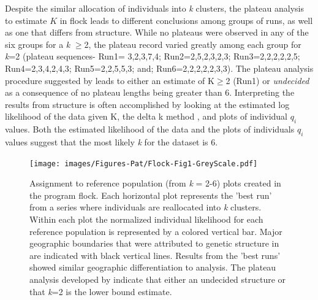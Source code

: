 Despite the similar allocation of individuals into \textit{k} clusters, the 
plateau analysis to estimate $K$ in {\sc flock} leads to different conclusions among groups of runs, as well as 
one that differs from {\sc structure}. While no plateaus were observed in any of the six groups 
for a \textit{k} $\geq$2, the plateau record varied greatly among each
group for \textit{k}=2 (plateau  sequences- Run1= 3,2,3,7,4; Run2=2,5,2,3,2,3; Run3=2,2,2,2,2,5; 
Run4=2,3,4,2,4,3; Run5=2,2,5,5,3; and; Run6=2,2,2,2,2,3,3). The plateau analysis 
procedure suggested by \citet{Duc&Tur2012} leads to 
either an estimate of K$\geq$2 (Run1) or \textit{undecided} as a consequence of no plateau 
lengths being greater than 6. Interpreting the results from {\sc structure} is often accomplished by 
looking at the estimated log likelihood of the data given K, the delta k method \citep{Evannoetal2005}, and plots of 
individual \textit{$q_i$} values. Both the estimated likelihood of the data
and the plots of individuals \textit{$q_i$} values suggest that 
the most likely \textit{k} for the dataset is 6. 

\begin{figure}
\begin{center}
    \texttt{[image: images/Figures-Pat/Flock-Fig1-GreyScale.pdf]} %
    \caption{Assignment to reference population (from \textit{k} = 2-6) plots created 
in the program {\sc flock}. Each horizontal plot represents the 'best run' from a 
series where individuals are reallocated into \textit{k} clusters. Within each plot 
the normalized individual likelihood for each reference population is represented by a 
colored vertical bar. Major geographic boundaries that were attributed to genetic 
structure in \citet{Garzaetal_norcal} are indicated with black vertical lines. Results 
from the 'best runs' showed similar geographic differentiation to 
\citet{Garzaetal_norcal} analysis. The plateau analysis developed by 
\citet{Duc&Tur2012} indicate that either an undecided structure or that \textit{k}=2 
is the lower bound estimate.}
    \label{Fig.1}
\end{center}
\end{figure}

